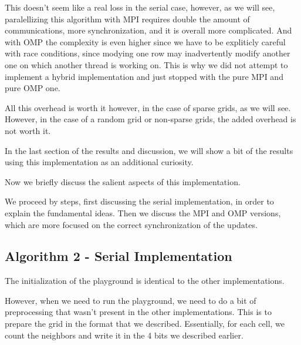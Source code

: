 \documentclass{report}
\begin{document}
This doesn't seem like a real loss in the serial case, however, as we will see, 
paralellizing this algorithm with MPI requires double the amount of 
communications, more synchronization, and it is overall more complicated. 
And with OMP the complexity is even higher since we have to be expliticly careful 
with race conditions, since modying one row may inadvertently modify another one 
on which another thread is working on. This is why we did not attempt to 
implement a hybrid implementation and just stopped with the pure MPI and pure 
OMP one. 

All this overhead is worth it however, in the case of sparse grids, as we will 
see. However, in the case of a random grid or non-sparse grids, the added 
overhead is not worth it. 

In the last section of the results and discussion, we will show a bit of the 
results using this implementation as an additional curiosity. 

Now we briefly discuss the salient aspects of this implementation. 

We proceed by steps, first discussing the serial implementation, in order to 
explain the fundamental ideas. Then we discuss the MPI and OMP versions, 
which are more focused on the correct synchronization of the updates. 

\subsection{Algorithm 2 - Serial Implementation}

The initialization of the playground is identical to the other implementations.

However, when we need to run the playground, we need to do a bit of preprocessing 
that wasn't present in the other implementations. This is to prepare the grid 
in the format that we described. Essentially, for each cell, we count the neighbors 
and write it in the 4 bits we described earlier.
\end{document}

